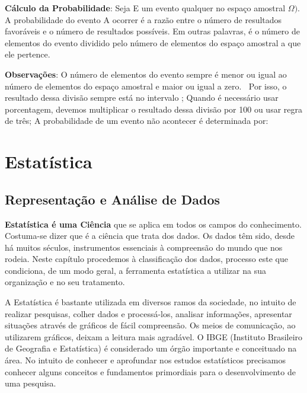 \begin{multicols*}{2}
	\textbf{Cálculo da Probabilidade}: Seja E um evento qualquer no espaço amostral $\Omega)$. A probabilidade do evento A ocorrer é a razão entre o número de resultados favoráveis e o número de resultados possíveis. Em outras palavras, é o número de elementos do evento dividido pelo número de elementos do espaço amostral a que ele pertence.


	\textbf{Observações}:  O número de elementos do evento sempre é menor ou igual ao número de elementos do espaço amostral e maior ou igual a zero. $ \ $ Por isso, o resultado dessa divisão sempre está no intervalo ; Quando é necessário usar porcentagem, devemos multiplicar o resultado dessa divisão por 100 ou usar regra de três;
	A probabilidade de um evento não acontecer é determinada por:







	\section{Estatística}

	\subsection{Representação e Análise de Dados}
	\textbf{ Estatística é uma Ciência} que se aplica em todos os campos do conhecimento. Costuma-se dizer que é a ciência que trata dos dados. Os dados têm sido, desde há muitos séculos, instrumentos essenciais à compreensão do mundo que nos rodeia. Neste capítulo procedemos à classificação dos dados, processo este que condiciona, de um modo geral, a ferramenta estatística a utilizar na sua organização e no seu tratamento.

	A Estatística é bastante utilizada em diversos ramos da sociedade, no intuito de realizar pesquisas, colher dados e processá-los, analisar informações, apresentar situações através de gráficos de fácil compreensão. Os meios de comunicação, ao utilizarem gráficos, deixam a leitura mais agradável. O IBGE (Instituto Brasileiro de Geografia e Estatística) é considerado um órgão importante e conceituado na área. No intuito de conhecer e aprofundar nos estudos estatísticos precisamos conhecer alguns conceitos e fundamentos primordiais para o desenvolvimento de uma pesquisa.


\end{multicols*}
